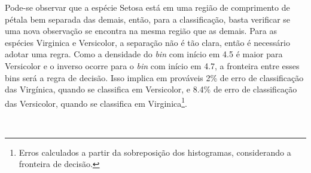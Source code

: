 \documentclass[
  a4paperpaper,
]{article}
\newenvironment{Shaded}{\begin{snugshade}}{\end{snugshade}}
\newcommand{\AttributeTok}[1]{\textcolor[rgb]{0.40,0.45,0.13}{#1}}
\newcommand{\CommentTok}[1]{\textcolor[rgb]{0.37,0.37,0.37}{#1}}
\newcommand{\ConstantTok}[1]{\textcolor[rgb]{0.56,0.35,0.01}{#1}}
\newcommand{\DecValTok}[1]{\textcolor[rgb]{0.68,0.00,0.00}{#1}}
\newcommand{\FunctionTok}[1]{\textcolor[rgb]{0.28,0.35,0.67}{#1}}
\newcommand{\NormalTok}[1]{\textcolor[rgb]{0.00,0.23,0.31}{#1}}
\newcommand{\SpecialCharTok}[1]{\textcolor[rgb]{0.37,0.37,0.37}{#1}}
\newcommand{\StringTok}[1]{\textcolor[rgb]{0.13,0.47,0.30}{#1}}
\begin{document}
Pode-se observar que a espécie Setosa está em uma região de comprimento
de pétala bem separada das demais, então, para a classificação, basta
verificar se uma nova observação se encontra na mesma região que as
demais. Para as espécies Virginica e Versicolor, a separação não é tão
clara, então é necessário adotar uma regra. Como a densidade do
\emph{bin} com início em 4.5 é maior para Versicolor e o inverso ocorre
para o \emph{bin} com início em 4.7, a fronteira entre esses bins será a
regra de decisão. Isso implica em prováveis 2\% de erro de classificação
das Virgínica, quando se classifica em Versicolor, e 8.4\% de erro de
classificação das Versicolor, quando se classifica em
Virginica\footnote{Erros calculados a partir da sobreposição dos
  histogramas, considerando a fronteira de decisão.}.

~

\begin{Shaded}
\end{Shaded}
\end{document}
